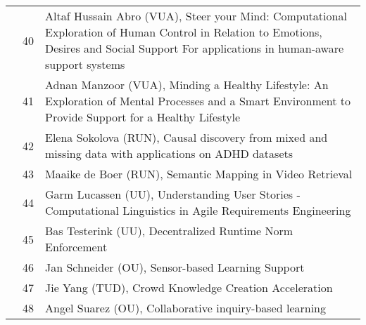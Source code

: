 \begin{longtabu}{@{}l@{ }l@{\hspace{1em}}X}
	&	 40	&	 Altaf Hussain Abro (VUA), Steer your Mind: Computational Exploration of Human Control in Relation to Emotions, Desires and Social Support For applications in human-aware support systems \\
	&	 41	&	 Adnan Manzoor (VUA), Minding a Healthy Lifestyle: An Exploration of Mental Processes and a Smart Environment to Provide Support for a Healthy Lifestyle\\
	&	 42	&	 Elena Sokolova (RUN), Causal discovery from mixed and missing data with applications on ADHD  datasets\\
	&	 43	&	 Maaike de Boer (RUN), Semantic Mapping in Video Retrieval\\
	&	 44	&	 Garm Lucassen (UU), Understanding User Stories - Computational Linguistics in Agile Requirements Engineering\\
	&	 45	&	 Bas Testerink	(UU), Decentralized Runtime Norm Enforcement\\
	&	 46	&	 Jan Schneider	(OU), Sensor-based Learning Support\\
	&	 47	&	 Jie Yang (TUD), Crowd Knowledge Creation Acceleration\\
	&	 48	&	 Angel Suarez (OU), Collaborative inquiry-based learning\\


\end{longtabu}
